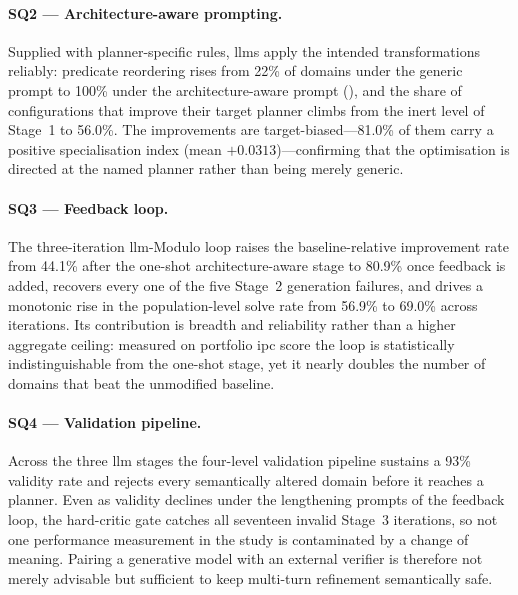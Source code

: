 \paragraph{SQ2 --- Architecture-aware prompting.}
Supplied with planner-specific rules, \glspl{llm} apply the intended transformations reliably: predicate reordering rises from 22\% of domains under the generic prompt to 100\% under the architecture-aware prompt (), and the share of configurations that improve their target planner climbs from the inert level of Stage~1 to 56.0\%.
The improvements are target-biased---81.0\% of them carry a positive specialisation index (mean $+0.0313$)---confirming that the optimisation is directed at the named planner rather than being merely generic.

\paragraph{SQ3 --- Feedback loop.}
The three-iteration \gls{llm}-Modulo loop raises the baseline-relative improvement rate from 44.1\% after the one-shot architecture-aware stage to 80.9\% once feedback is added, recovers every one of the five Stage~2 generation failures, and drives a monotonic rise in the population-level solve rate from 56.9\% to 69.0\% across iterations.
Its contribution is breadth and reliability rather than a higher aggregate ceiling: measured on portfolio \gls{ipc} score the loop is statistically indistinguishable from the one-shot stage, yet it nearly doubles the number of domains that beat the unmodified baseline.

\paragraph{SQ4 --- Validation pipeline.}
Across the three \gls{llm} stages the four-level validation pipeline sustains a 93\% validity rate and rejects every semantically altered domain before it reaches a planner.
Even as validity declines under the lengthening prompts of the feedback loop, the hard-critic gate catches all seventeen invalid Stage~3 iterations, so not one performance measurement in the study is contaminated by a change of meaning.
Pairing a generative model with an external verifier is therefore not merely advisable but sufficient to keep multi-turn refinement semantically safe.

